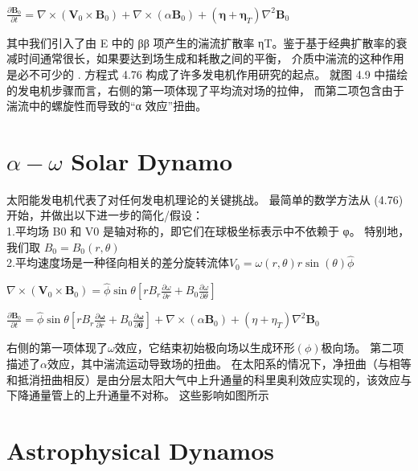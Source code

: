 \documentclass[12pt, a4paper, oneside]{ctexart}
\begin{document}
\begin{spacing}{2.0}
\begin{center}
    $\displaystyle\frac{\partial\mathbf{B}_0}{\partial t}=\nabla\times\left(\mathbf{V}_0\times\mathbf{B}_0\right)+\nabla\times\left(\alpha\mathbf{B}_0\right)+\left(\mathbf{\eta}+\mathbf{\eta}_T\right)\nabla^2\mathbf{B}_0$
\end{center}
其中我们引入了由 E 中的 ββ 项产生的湍流扩散率 ηT。鉴于基于经典扩散率的衰减时间通常很长，如果要达到场生成和耗散之间的平衡，
介质中湍流的这种作用是必不可少的 . 方程式 4.76 构成了许多发电机作用研究的起点。 就图 4.9 中描绘的发电机步骤而言，右侧的第一项体现了平均流对场的拉伸，
而第二项包含由于湍流中的螺旋性而导致的“α 效应”扭曲。
\section{$\alpha−\omega$ Solar Dynamo}

太阳能发电机代表了对任何发电机理论的关键挑战。 最简单的数学方法从 (4.76) 开始，并做出以下进一步的简化/假设：
\\
1.平均场 B0 和 V0 是轴对称的，即它们在球极坐标表示中不依赖于 φ。 特别地，我们取 $B_0 = B_0(r, \theta)$\\
2.平均速度场是一种径向相关的差分旋转流体$V_0 = \omega(r, \theta)r \sin(\theta)\hat{\phi}$

\begin{center}
    $\displaystyle\nabla\times(\mathbf{V}_0\times\mathbf{B}_0)=\hat{\phi}\sin\theta\left[r B_r\frac{\partial\omega}{\partial r}+B_0\frac{\partial\omega}{\partial\theta}\right]$
\end{center}

\begin{center}
    $\displaystyle\frac{\partial\mathbf{B}_0}{\partial t}=\hat{\phi}\sin\theta\left[rB_r\frac{\partial\mathbf{\omega}}{\partial r}+B_0\frac{\partial\mathbf{\omega}}{\partial\mathbf{\theta}}\right]+\nabla\times\left(\alpha\mathbf{B}_0\right)+\left(\mathfrak{\eta}+\mathfrak{\eta}_T\right)\nabla^2\mathbf{B}_0$
\end{center}

右侧的第一项体现了$\omega$效应，它结束初始极向场以生成环形$ (\phi) $极向场。 第二项描述了$\alpha$效应，其中湍流运动导致场的扭曲。 
在太阳系的情况下，净扭曲（与相等和抵消扭曲相反）是由分层太阳大气中上升通量的科里奥利效应实现的，该效应与下降通量管上的上升通量不对称。 这些影响如图所示


\section{Astrophysical Dynamos}


\end{spacing}
\end{document}

